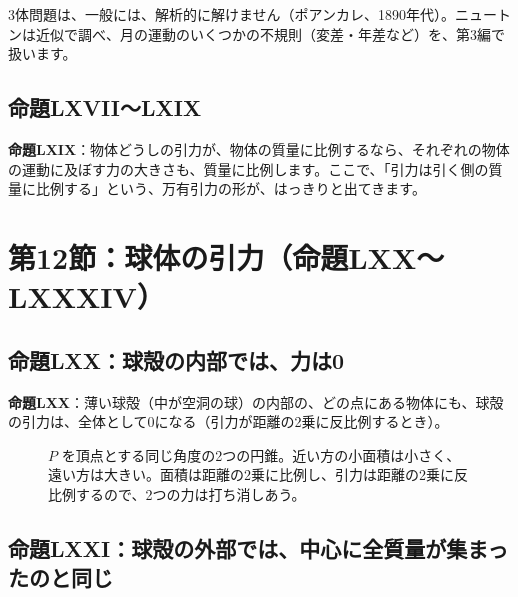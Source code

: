 \documentclass[a4paper,11pt,openany]{ltjsbook}
\begin{document}
3体問題は、一般には、解析的に解けません（ポアンカレ、1890年代）。ニュートンは近似で調べ、月の運動のいくつかの不規則（変差・年差など）を、第3編で扱います。

\subsection{命題LXVII〜LXIX}

\textbf{命題LXIX}：物体どうしの引力が、物体の質量に比例するなら、それぞれの物体の運動に及ぼす力の大きさも、質量に比例します。ここで、「引力は引く側の質量に比例する」という、万有引力の形が、はっきりと出てきます。

\section{第12節：球体の引力（命題LXX〜LXXXIV）}

\subsection{命題LXX：球殻の内部では、力は0}

\textbf{命題LXX}：薄い球殻（中が空洞の球）の内部の、どの点にある物体にも、球殻の引力は、全体として0になる（引力が距離の2乗に反比例するとき）。

\begin{figure}[htbp]
\centering
{}
\caption{$P$ を頂点とする同じ角度の2つの円錐。近い方の小面積は小さく、遠い方は大きい。面積は距離の2乗に比例し、引力は距離の2乗に反比例するので、2つの力は打ち消しあう。}
\end{figure}

\subsection{命題LXXI：球殻の外部では、中心に全質量が集まったのと同じ}
\end{document}
